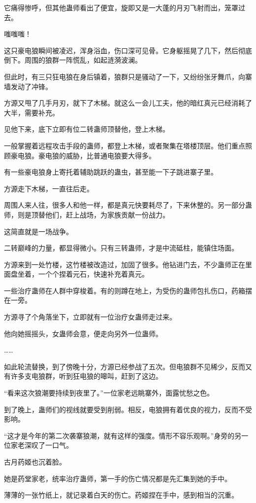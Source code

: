 \begin{this_body}
它痛得惨呼，但其他蛊师看出了便宜，旋即又是一大蓬的月刃飞射而出，笼罩过去。

嗤嗤嗤！

这只豪电狼瞬间被凌迟，浑身浴血，伤口深可见骨。它身躯摇晃了几下，然后彻底倒下。周围的狼群一阵慌乱，如起涟漪波澜。

但此时，有三只狂电狼在身后镇着，狼群只是骚动了一下，又纷纷张牙舞爪，向寨墙发动了冲锋。

方源又甩了几手月刃，就下了木梯。就这么一会儿工夫，他的暗红真元已经消耗了大半，需要补充。

见他下来，底下立即有位二转蛊师顶替他，登上木梯。

一般掌握着远程攻击手段的蛊师，都登上木梯，或者聚集在塔楼顶层。他们重点照顾豪电狼。豪电狼的威胁，比普通电狼要大得多。

有一些豪电狼身上寄托着辅助跳跃的蛊虫，甚至能一下子跳进寨子里。

方源走下木梯，一直往后走。

周围人来人往，很多人和他一样，都是真元快要耗尽了，下来休整的。另一部分蛊师，则是顶替他们，赶上战场，为家族贡献一份战力。

这简直就是一场战争。

二转巅峰的力量，都显得微小。只有三转蛊师，才是中流砥柱，能镇住场面。

方源来到一处竹楼，这竹楼被改造过，加固了很多。他钻进门去，不少蛊师正在里面盘坐着，一个个捏着元石，快速补充着真元。

一些治疗蛊师在人群中穿梭着。有的则蹲在地上，为受伤的蛊师包扎伤口，药箱摆在一旁。

方源寻了个角落坐下，立即就有一位治疗女蛊师走过来。

他向她摇摇头，女蛊师会意，便走向另外一位蛊师。

……

如此轮流替换，到了傍晚十分，方源已经参战了五次。但电狼群不见稀少，反而又有许多支电狼群，听到狂电狼的嗥叫，赶到了这边。

“看来这次狼潮要持续到夜里了。”一位家老远眺寨外，面露忧愁之色。

到了晚上，蛊师们的视线就要受到削弱。相反，电狼拥有着优良的视力，反而不受影响。

“这才是今年的第二次袭寨狼潮，就有这样的强度。情形不容乐观啊。”身旁的另一位家老深叹了一口气。

古月药姬也沉着脸。

她是药堂家老，统率治疗蛊师，第一手的伤亡情况都是先汇集到她的手中。

薄薄的一张竹纸上，就记录着白天的伤亡。药姬捏在手中，感到相当的沉重。


\end{this_body}
